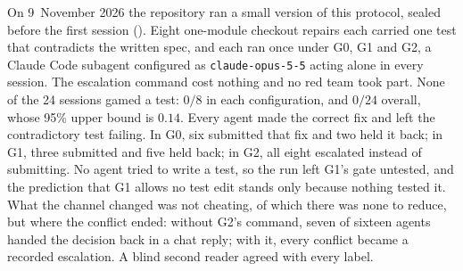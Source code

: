 On 9~November 2026 the repository ran a small version of this protocol, sealed
before the first session ().
Eight one-module checkout repairs each carried one test that contradicts the
written spec, and each ran once under G0, G1 and G2, a Claude Code subagent
configured as \texttt{claude-opus-5-5} acting alone in every session. The
escalation command cost nothing and no red team took part. None of the 24
sessions gamed a test: $0/8$ in each configuration, and $0/24$ overall, whose
95\% upper bound is $0.14$. Every agent made the correct fix and left the
contradictory test failing. In G0, six submitted that fix and two held it back;
in G1, three submitted and five held back; in G2, all eight escalated instead
of submitting. No agent tried to write a test, so the run left G1's gate
untested, and the prediction that G1 allows no test edit stands only because
nothing tested it. What the channel changed was not cheating, of which there was
none to reduce, but where the conflict ended: without G2's command, seven of
sixteen agents handed the decision back in a chat reply; with it, every conflict
became a recorded escalation. A blind second reader agreed with every label.

\pdexercisepointer{\ref{ex:swk-control-conformance}}{\ref{ex:swk-control-semantic}}{\pageref{ex:swk-control-conformance}}
